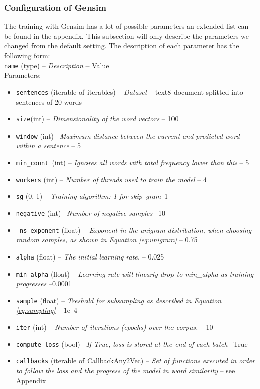 \documentclass[conference]{IEEEtran}
\begin{document}
\subsubsection{Configuration of Gensim}
The training with Gensim has a lot of possible parameters an extended list can be found in the appendix. This subsection will only describe the parameters we changed from the default setting. The description of each parameter has the following form: \\
\texttt{name} (type) -- \textit{Description} -- Value\\
Parameters:
\begin{itemize}
\item \texttt{sentences} (iterable of iterables) -- \textit{Dataset} -- text8 document splitted into sentences of 20 words
\item \texttt{size}(int) – \textit{Dimensionality of the word vectors } -- 100
\item \texttt{window} (int) --\textit {Maximum distance between the current and predicted word within a sentence }-- 5
\item \texttt{min\_count }(int) --\textit{ Ignores all words with total frequency lower than this }-- 5
\item \texttt{workers} (int) -- \textit{ Number of threads used to train the model} -- 4
\item \texttt{sg} ({0, 1}) --\textit{ Training algorithm: 1 for skip--gram}--1
\item \texttt{negative} (int) --\textit{Number of negative samples}-- 10
\item \texttt{ ns\_exponent} (float) --\textit{ Exponent in the unigram distribution, when choosing random samples, as shown in Equation \ref{eq:unigram} }-- 0.75
\item \texttt{alpha} (float) --\textit{ The initial learning rate. }-- 0.025
\item \texttt{min\_alpha} (float) --\textit{ Learning rate will linearly drop to min\_alpha as training progresses }--0.0001
\item \texttt{sample} (float) --\textit{ Treshold for subsampling as described in Equation \ref{eq:sampling}} -- 1e--4
\item \texttt{iter} (int) --\textit{ Number of iterations (epochs) over the corpus. }-- 10
\
\item \texttt{compute\_loss} (bool) --\textit{If True, loss is stored at the end of each batch}-- True
\item \texttt{callbacks} (iterable of CallbackAny2Vec) --\textit{ Set of functions executed in order to follow the loss and the progress of the model in word similarity }-- see Appendix
\end{itemize}
\end{document}
